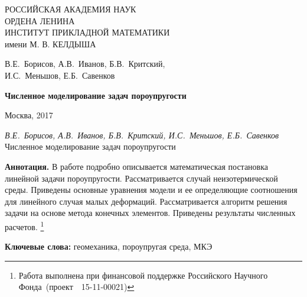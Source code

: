 \documentclass[a4paper, 12pt]{article}
\newcommand{\No}{\textnumero}
\begin{document}
\begin{titlepage}

\begin{center}
РОССИЙСКАЯ АКАДЕМИЯ НАУК \\
ОРДЕНА ЛЕНИНА \\
ИНСТИТУТ ПРИКЛАДНОЙ МАТЕМАТИКИ \\
имени М. В. КЕЛДЫША

\vspace*{60mm}

\large{В.Е.~Борисов, А.В.~Иванов, Б.В.~Критский,\\
И.С.~Меньшов, Е.Б.~Савенков
}

\vspace*{20mm}

\textbf{\Large
Численное моделирование задач
пороупругости
}

\vspace*{110mm}

\Large{Москва, 2017}

\vspace*{-50mm}

\end{center}

\end{titlepage}

\setcounter{page}{2}

\thispagestyle{empty}

\noindent\emph{ В.Е.~Борисов, А.В.~Иванов, Б.В.~Критский,
И.С.~Меньшов, Е.Б.~Савенков} Численное моделирование задач
пороупругости

\vspace*{5mm}

\noindent\textbf{ Аннотация.}
%
В работе подробно описывается математическая постановка линейной
задачи пороупругости. Рассматривается случай неизотермической среды.
Приведены основные уравнения модели и ее определяющие соотношения для
линейного случая малых деформаций. Рассматривается алгоритм решения
задачи на основе метода конечных элементов. Приведены результаты
численных расчетов.
\footnote{Работа выполнена при финансовой поддержке Российского Научного Фонда~(проект~\No~15-11-00021)}

\vspace*{3mm}

\noindent\textbf{Ключевые слова:} геомеханика, пороупругая среда, МКЭ

\vspace*{6mm}
\end{document}
